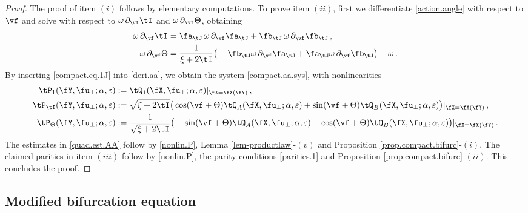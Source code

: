 \documentclass[a4paper,reqno,10pt]{article}
\newcommand{\pa}{\partial}
\begin{document}
\begin{proof}
	The proof of item $(i)$ follows by elementary computations. To prove item $(ii)$, first we differentiate \eqref{action.angle} with respect to $\vf$ and solve with respect to $\omega\,\pa_{\vf}\tI$ and $\omega\,\pa_{\vf}\Theta$, obtaining
	\begin{equation}\label{deri.aa}
		\begin{aligned}
			\omega\,\pa_{\vf} \tI &= \fa_{\tJ} \,\omega\,\pa_{\vf}\fa_{\tJ} + \fb_{\tJ}\,\omega\,\pa_{\vf}\fb_{\tJ} \,, \\
			\omega\,\pa_{\vf} \Theta& =\frac{1}{{\xi+2\tI}} \big(-\fb_{\tJ} \omega\,\pa_{\vf} \fa_{\tJ} + \fa_{\tJ} \omega\,\pa_{\vf}\fb_{\tJ} \big) - \omega\,.
		\end{aligned}
	\end{equation}
	By inserting \eqref{compact.eq.1J} into \eqref{deri.aa}, we obtain the system \eqref{compact.aa.sys}, with nonlinearities
	\begin{equation}\label{nonlin.P}
		\begin{aligned}
			\tP_{1}(\fY,\fu_{\perp};\alpha,\varepsilon)&:= \tQ_{1}(\fX,\fu_{\perp};\alpha,\varepsilon)|_{\fX=\fX(\fY)} \,, \\
			\tP_{\tI}(\fY,\fu_{\perp};\alpha,\varepsilon) &:= {\sqrt{\xi+2\tI}} \big( \cos(\vf+\Theta)  \tQ_{A}(\fX,\fu_{\perp};\alpha,\varepsilon)+\sin(\vf+\Theta)  \tQ_{B}(\fX,\fu_{\perp};\alpha,\varepsilon)\big)|_{\fX=\fX(\fY)} \,, \\
			\tP_{\Theta}(\fY,\fu_{\perp};\alpha,\varepsilon) & := \frac{1}{\sqrt{\xi+2\tI}} \big(-\sin(\vf+\Theta)  \tQ_{A}(\fX,\fu_{\perp};\alpha,\varepsilon)+ \cos(\vf+\Theta) \tQ_{B}(\fX,\fu_{\perp};\alpha,\varepsilon)  \big) |_{\fX=\fX(\fY)}\,.
		\end{aligned}
	\end{equation}
	The estimates in \eqref{quad.est.AA} follow by \eqref{nonlin.P}, Lemma \ref{lem-productlaw}-$(v)$ and Proposition \ref{prop.compact.bifurc}-$(i)$. The claimed parities in item $(iii)$ follow by \eqref{nonlin.P}, the parity conditions  \eqref{parities.1} and Proposition \ref{prop.compact.bifurc}-$(ii)$. This concludes the proof.
\end{proof}





\subsection{Modified bifurcation equation}\label{sec-MBE}
\end{document}

